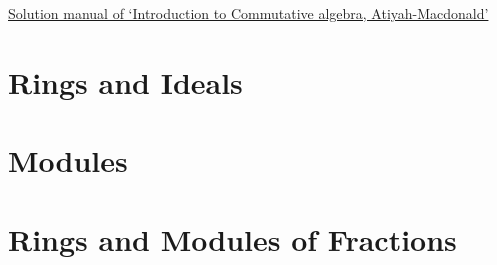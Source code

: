 \documentclass[answers, 12pt]{exam}
\begin{document}
\begin{center}\underline{Solution manual of `Introduction to Commutative algebra, Atiyah-Macdonald'}\end{center}
\newpage
\tableofcontents
\newpage

\section{Rings and Ideals}



\section{Modules}



\section{Rings and Modules of Fractions}
\end{document}
